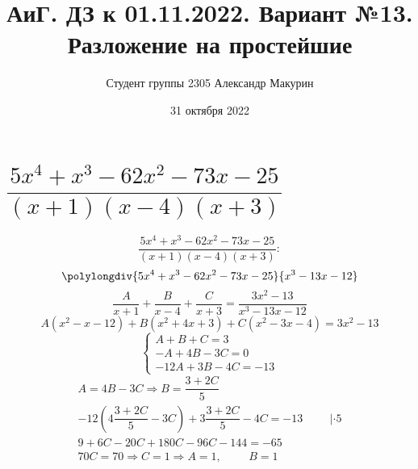 \documentclass[12pt]{article}
\title{АиГ. ДЗ к 01.11.2022. Вариант №13. Разложение на простейшие}
\author{Студент группы 2305 Александр Макурин}
\date{31 октября 2022}
\begin{document}
\maketitle

\begin{sloppypar}

    \section{$\dfrac{5x^4 + x^3 - 62x^2 - 73x - 25}{(x + 1) (x - 4) (x + 3)}$}
    \[
        \dfrac{5x^4 + x^3 - 62x^2 - 73x - 25}{(x + 1) (x - 4) (x + 3)}:
    \]
    \[
        \polylongdiv{5x^4 + x^3 - 62x^2 - 73x - 25}{x^3 - 13x - 12}
    \]
    \[
        \dfrac{A}{x + 1} + \dfrac{B}{x - 4} + \dfrac{C}{x + 3} = \dfrac{3x^2 - 13}{x^3 - 13x - 12}
    \]
    \[
        A(x^2 - x - 12) + B(x^2 + 4x + 3) + C(x^2 - 3x - 4) = 3x^2 - 13
    \]
    \[
        \left\{\begin{array}{ll}
            A + B + C = 3    \\
            -A + 4B - 3C = 0 \\
            -12A + 3B - 4C = -13
        \end{array}\right.
    \]
    \[
        \begin{array}{ll}
            A = 4B - 3C \Rightarrow B = \dfrac{3 + 2C}{5}                                      \\
            -12(4\dfrac{3 + 2C}{5} - 3C) + 3\dfrac{3 + 2C}{5} - 4C = -13 \hspace{1cm} |\cdot 5 \\
            9 + 6C - 20C + 180C - 96C - 144 = -65                                              \\
            70C = 70 \Rightarrow C = 1 \Rightarrow A = 1, \hspace{1cm} B = 1
        \end{array}
    \]


\end{sloppypar}
\end{document}
